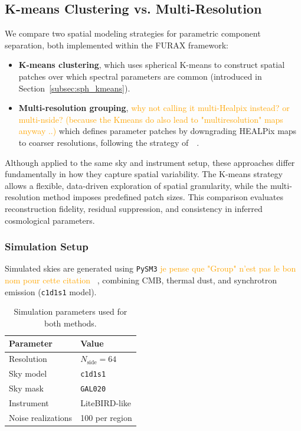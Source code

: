 \documentclass[fleqn,usenatbib]{mnras}
\newcommand{\je}[1]{\textcolor{orange}{#1}}
\begin{document}
\subsection{K-means Clustering vs. Multi-Resolution}
\label{subsec:comparison_setup}

We compare two spatial modeling strategies for parametric component separation, both implemented within the \textsc{FURAX} framework:
\begin{itemize}
    \item \textbf{K-means clustering}, which uses spherical K-means to construct spatial patches over which spectral parameters are common (introduced in Section~\ref{subsec:sph_kmeans}).
    \item \textbf{Multi-resolution grouping}, \je{why not calling it multi-Healpix instead? or multi-nside? 
(because the Kmeans do also lead to "multiresolution" maps anyway ..)} which defines parameter patches by downgrading HEALPix maps to coarser resolutions, following the strategy of~\citep{LiteBIRD_PTEP_2022}~\citep{ERRAR18}.
\end{itemize}

Although applied to the same sky and instrument setup, these approaches differ fundamentally in how they capture spatial variability. The K-means strategy allows a flexible, data-driven exploration of spatial granularity, while the multi-resolution method imposes predefined patch sizes. This comparison evaluates reconstruction fidelity, residual suppression, and consistency in inferred cosmological parameters.

\subsubsection*{Simulation Setup}

Simulated skies are generated using \texttt{PySM3} \je{je pense que "Group" n'est pas le bon nom pour cette citation} ~\citep{Panexp_2025,Zonca_2021,Thorne_2017}, combining CMB, thermal dust, and synchrotron emission (\texttt{c1d1s1} model).

\begin{table}
    \centering
    \small
    \caption{Simulation parameters used for both methods.}
    \label{tab:comparison_sim}
    \begin{tabular}{@{}p{3.5cm}|p{5cm}@{}}
        \toprule
        \textbf{Parameter} & \textbf{Value} \\
        \midrule
        Resolution & \( N_{\text{side}} = 64 \) \\
        Sky model & \texttt{c1d1s1} \\
        Sky mask & \texttt{GAL020} \\
        Instrument & LiteBIRD-like \\
        Noise realizations & 100 per region \\
        \bottomrule
    \end{tabular}
\end{table}
\end{document}
